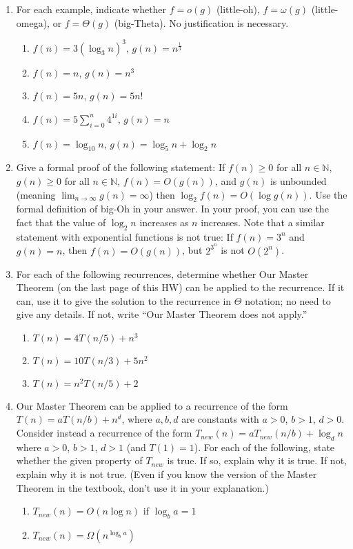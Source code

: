 \documentclass{article}
\begin{document}
\begin{enumerate}
    \item For each example, indicate whether $f = o(g)$ (little-oh), $f = \omega(g)$ (little-omega), or $f = \Theta(g)$ (big-Theta). No justification is necessary.
    \begin{enumerate}
        \item $f(n) = 3(\log_3 n)^3$, $g(n) = n^{\frac{1}{3}}$
        \item $f(n) = n$, $g(n) = n^3$
        \item $f(n) = 5n$, $g(n) = 5n!$
        \item $f(n) = 5 \sum_{i=0}^n 4^{1i}$, $g(n) = n$
        \item $f(n) = \log_{10} n$, $g(n) = \log_5 n + \log_2 n$
    \end{enumerate}

    \item Give a formal proof of the following statement: If $f(n) \ge 0$ for all $n \in \mathbb{N}$, $g(n) \ge 0$ for all $n \in \mathbb{N}$, $f(n) = O(g(n))$, and $g(n)$ is unbounded (meaning $\lim_{n \to \infty} g(n) = \infty$) then $\log_2 f(n) = O(\log g(n))$. Use the formal definition of big-Oh in your answer. In your proof, you can use the fact that the value of $\log_2 n$ increases as $n$ increases. Note that a similar statement with exponential functions is not true: If $f(n) = 3^n$ and $g(n) = n$, then $f(n) = O(g(n))$, but $2^{3^n}$ is not $O(2^n)$.

    \item For each of the following recurrences, determine whether Our Master Theorem (on the last page of this HW) can be applied to the recurrence. If it can, use it to give the solution to the recurrence in $\Theta$ notation; no need to give any details. If not, write “Our Master Theorem does not apply.”
    \begin{enumerate}
        \item $T(n) = 4T(n/5) + n^3$
        \item $T(n) = 10T(n/3) + 5n^2$
        \item $T(n) = n^2 T(n/5) + 2$
    \end{enumerate}

    \item Our Master Theorem can be applied to a recurrence of the form $T(n) = aT(n/b) + n^d$, where $a, b, d$ are constants with $a > 0$, $b > 1$, $d > 0$. Consider instead a recurrence of the form $T_{new}(n) = aT_{new}(n/b) + \log_d n$ where $a > 0$, $b > 1$, $d > 1$ (and $T(1) = 1$). For each of the following, state whether the given property of $T_{new}$ is true. If so, explain why it is true. If not, explain why it is not true. (Even if you know the version of the Master Theorem in the textbook, don’t use it in your explanation.)
    \begin{enumerate}
        \item $T_{new}(n) = O(n \log n)$ if $\log_b a = 1$
        \item $T_{new}(n) = \Omega(n^{\log_b a})$
    \end{enumerate}


\end{enumerate}
\end{document}
